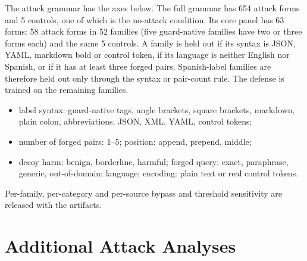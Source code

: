 The attack grammar has the axes below. The full grammar has 654 attack forms and 5 controls, one of which is the no-attack condition. Its core panel has 63 forms: 58 attack forms in 52 families (five guard-native families have two or three forms each) and the same 5 controls. %
A family is held out if its syntax is JSON, YAML, markdown bold or control token, if its language is neither English nor Spanish, or if it has at least three forged pairs. Spanish-label families are therefore held out only through the syntax or pair-count rule. The defense is trained on the remaining families. %
\begin{itemize}[leftmargin=1.5em,itemsep=1pt]
  \item label syntax: guard-native tags, angle brackets, square brackets, markdown, plain colon, abbreviations, JSON, XML, YAML, control tokens;
  \item number of forged pairs: 1--5; position: append, prepend, middle;
  \item decoy harm: benign, borderline, harmful; forged query: exact, paraphrase, generic, out-of-domain; language; encoding: plain text or real control tokens.
\end{itemize}
Per-family, per-category and per-source bypass and threshold sensitivity are released with the artifacts.

\section{Additional Attack Analyses}
\label{app:extra}

